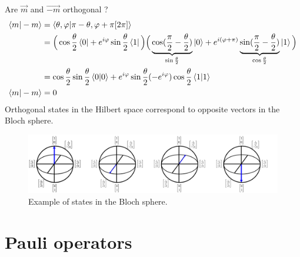\documentclass{article}
\begin{document}
Are $\vec{m}$ and $\vec{-m}$ orthogonal ?
\begin{equation}
    \label{m-m-orthogonal}
    \begin{aligned}
        \braket{m|-m}
            & = \braket{\theta,\varphi|\pi-\theta,\varphi+\pi[2\pi]} \\
            & = \Big(\cos\frac{\theta}{2}\bra{0}+e^{i\varphi}\sin\frac{\theta}{2}\bra{1}\Big)
                \Big(\underbrace{\cos(\frac{\pi}{2}-\frac{\theta}{2})}_{\sin\frac{\theta}{2}}
                \ket{0}+e^{i(\varphi+\pi)}
                \underbrace{\sin(\frac{\pi}{2}-\frac{\theta}{2})}_{
                \cos\frac{\theta}{2}}\ket{1}\Big) \\
            & = \cos\frac{\theta}{2}\sin\frac{\theta}{2}\braket{0|0}
                +e^{i\varphi}\sin\frac{\theta}{2}(-e^{i\varphi})\cos\frac{\theta}{2}\braket{1|1} \\
        \braket{m|-m}
            & = 0
    \end{aligned}
\end{equation}
Orthogonal states in the Hilbert space correspond to opposite vectors in the
Bloch sphere.

\begin{figure}[h]
    \includegraphics[scale=0.3]{orthogonal-states-bloch-sphere.png}
    \caption{Example of states in the Bloch sphere.}
\end{figure}

\section{Pauli operators}
\end{document}
